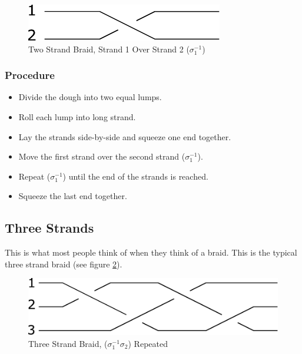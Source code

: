 \documentclass[10pt, openany]{book}
\begin{document}
\begin{figure}[h]
  \center
  \includegraphics{Figures/2-strands.pdf}
  \caption{Two Strand Braid, Strand 1 Over Strand 2 ($\sigma^{-1}_1$)}
  \label{fig:2Strand}
\end{figure}

\subsubsection{Procedure}
\begin{itemize}
  \item Divide the dough into two equal lumps.
  \item Roll each lump into long strand.
  \item Lay the strands side-by-side and squeeze one end together.
  \item Move the first strand over the second strand ($\sigma^{-1}_1$).
  \item Repeat ($\sigma^{-1}_1$) until the end of the strands is reached.
  \item Squeeze the last end together.
\end{itemize}

\subsection{Three Strands}
This is what most people think of when they think of a braid.  This is the typical three strand braid (see figure \ref{fig:3Strand}).

\begin{figure}[h]
  \center
  \includegraphics{Figures/3-strands.pdf}
  \caption{Three Strand Braid, ($\sigma^{-1}_1\sigma_2$) Repeated}
  \label{fig:3Strand}
\end{figure}
\end{document}
